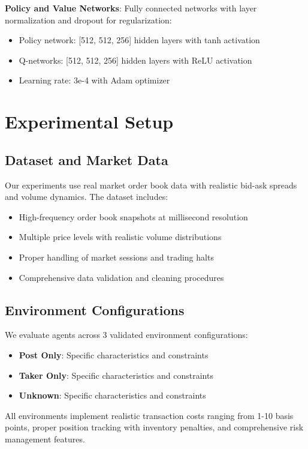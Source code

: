 \documentclass[11pt,a4paper]{article}
\begin{document}
\textbf{Policy and Value Networks}: Fully connected networks with layer normalization and dropout for regularization:
\begin{itemize}
\item Policy network: [512, 512, 256] hidden layers with tanh activation
\item Q-networks: [512, 512, 256] hidden layers with ReLU activation
\item Learning rate: 3e-4 with Adam optimizer
\end{itemize}

\section{Experimental Setup}

\subsection{Dataset and Market Data}

Our experiments use real market order book data with realistic bid-ask spreads and volume dynamics. The dataset includes:
\begin{itemize}
\item High-frequency order book snapshots at millisecond resolution
\item Multiple price levels with realistic volume distributions
\item Proper handling of market sessions and trading halts
\item Comprehensive data validation and cleaning procedures
\end{itemize}

\subsection{Environment Configurations}

We evaluate agents across 3 validated environment configurations:
\begin{itemize}
\item \textbf{Post Only}: Specific characteristics and constraints
\item \textbf{Taker Only}: Specific characteristics and constraints
\item \textbf{Unknown}: Specific characteristics and constraints
\end{itemize}

All environments implement realistic transaction costs ranging from 1-10 basis points, proper position tracking with inventory penalties, and comprehensive risk management features.
\end{document}

